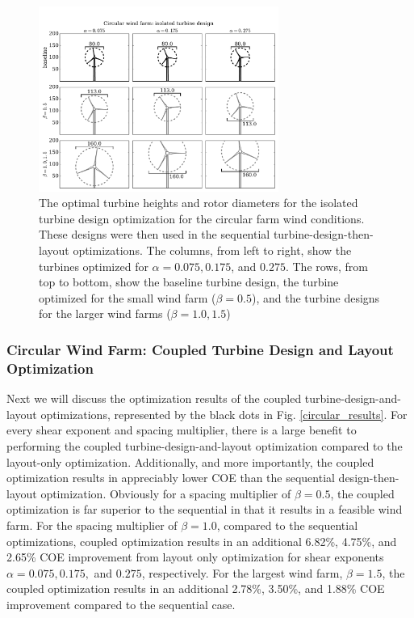 \begin{figure}[htbp]
  \centering
  \includegraphics[width=0.7\textwidth]{Figures/turbineSizesCircular_sequential.pdf}
  \caption{\label{circular_turbines_seq} The optimal turbine heights and rotor diameters for the isolated turbine design optimization for the circular farm wind conditions. These designs were then used in the sequential turbine-design-then-layout optimizations. The columns, from left to right, show the turbines optimized for $\alpha=0.075,0.175$, and $0.275$. The rows, from top to bottom, show the baseline turbine design, the turbine optimized for the small wind farm ($\beta=0.5$), and the turbine designs for the larger wind farms ($\beta=1.0,1.5$)}
\end{figure}



\subsubsection{Circular Wind Farm: Coupled Turbine Design and Layout Optimization}
Next we will discuss the optimization results of the coupled turbine-design-and-layout optimizations, represented by the black dots in Fig. \ref{circular_results}. For every shear exponent and spacing multiplier, there is a large benefit to performing the coupled turbine-design-and-layout optimization compared to the layout-only optimization. Additionally, and more importantly, the coupled optimization results in appreciably lower COE than the sequential design-then-layout optimization. Obviously for a spacing multiplier of $\beta=0.5$, the coupled optimization is far superior to the sequential in that it results in a feasible wind farm. For the spacing multiplier of $\beta=1.0$, 
compared to the sequential optimizations, coupled optimization results in an additional 6.82\%, 4.75\%, and 2.65\% COE improvement from layout only optimization for shear exponents $\alpha=0.075, 0.175,$ and $0.275$, respectively. For the largest wind farm, $\beta=1.5$, the coupled optimization results in an additional 2.78\%, 3.50\%, and 1.88\% COE improvement compared to the sequential case. 

